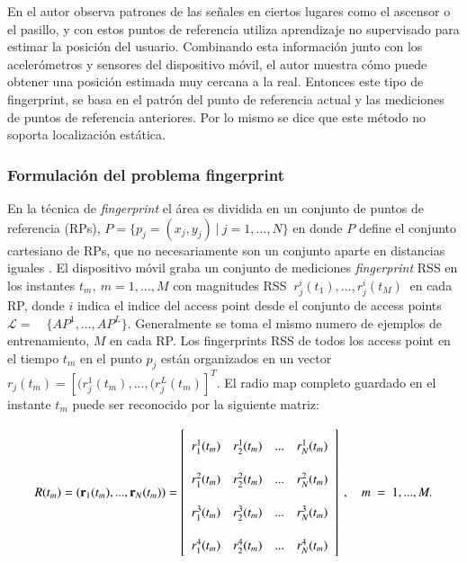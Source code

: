 \begin{enumerate}
En \cite{Wang:2012:NNW:2307636.2307655} el autor observa patrones de las señales en ciertos lugares como el ascensor o el pasillo, y con estos puntos de referencia utiliza aprendizaje no supervisado para estimar la posición del usuario. Combinando esta información junto con los acelerómetros y sensores del dispositivo móvil, el autor muestra cómo puede obtener una posición estimada muy cercana a la real. Entonces este tipo de fingerprint, se basa en el patrón del punto de referencia actual y las mediciones de puntos de referencia anteriores. Por lo mismo se dice que este método no soporta localización estática.

\end{enumerate}

\subsubsection{Formulación del problema fingerprint}

En la técnica de \textit{fingerprint} el área es dividida en un conjunto de puntos de referencia (RPs), \(P = \{p_{j} = (x_{j}, y_{j}) \ | \ j = 1,...,N\}\) en donde \(P\) define el conjunto cartesiano de RPs, que no necesariamente son un conjunto aparte en distancias iguales \citep{7874080}. El dispositivo móvil graba un conjunto de mediciones \textit{fingerprint} RSS en los instantes \(t_{m} ,\ m = 1,...,M\) con magnitudes RSS \( \ r_{j}^{i}(t_{1}),..., r_{j}^{i}(t_{M}) \ \) en cada RP, donde \(i\) indica el indice del access point desde el conjunto de access points \( \mathcal{L} = \quad \{AP^{1}, ..., AP^{L}\}\). Generalmente se toma el mismo numero de ejemplos de entrenamiento, \(M\) en cada RP. Los fingerprints RSS de todos los access point en el tiempo \(t_{m}\) en el punto \(p_{j}\) están organizados en un vector \(r_{j}(t_{m}) = [(r_{j}^{1}(t_{m}),...,(r_{j}^{L}(t_{m})]^{T}\). El radio map completo guardado en el instante \(t_m\) puede ser reconocido por la siguiente matriz:


\begin{align}
\def\arraystretch{2.2}
   R(t_{m}) = (\textbf{r}_{1}(t_{m}), ..., \textbf{r}_{N}(t_{m})) = 
  \left[ {\begin{array}{cccc}
   r_{1}^{1}(t_{m}) & r_{2}^{1}(t_{m}) & ... & r_{N}^{1}(t_{m}) \\
   r_{1}^{2}(t_{m}) & r_{2}^{2}(t_{m}) & ... & r_{N}^{2}(t_{m}) \\
   r_{1}^{3}(t_{m}) & r_{2}^{3}(t_{m}) & ... & r_{N}^{3}(t_{m}) \\
   r_{1}^{4}(t_{m}) & r_{2}^{4}(t_{m}) & ... & r_{N}^{4}(t_{m}) \\
  \end{array} } \right] \ , \quad 
m\ = \ 1,...,M.
\end{align}
 

